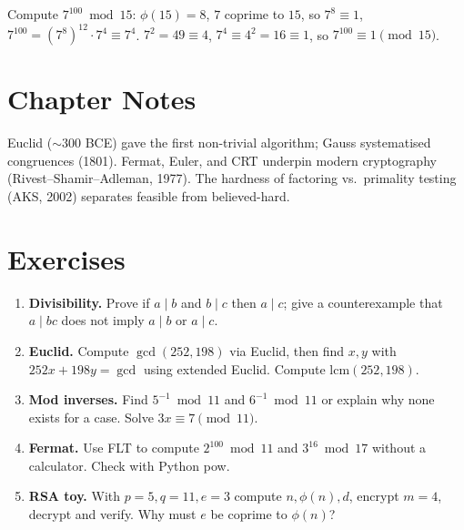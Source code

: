 Compute $7^{100}\bmod15$: $\phi(15)=8$, $7$ coprime to $15$, so $7^8\equiv1$, $7^{100}=(7^8)^{12}\cdot7^4\equiv7^4$. $7^2=49\equiv4$, $7^4\equiv4^2=16\equiv1$, so $7^{100}\equiv1\pmod{15}$.

\section{Chapter Notes}
Euclid ($\sim300$ BCE) gave the first non-trivial algorithm; Gauss systematised congruences (1801). Fermat, Euler, and CRT underpin modern cryptography (Rivest--Shamir--Adleman, 1977). The hardness of factoring vs.\ primality testing (AKS, 2002) separates feasible from believed-hard.

\section{Exercises}
\label{sec:ch08-exercises}
\begin{enumerate}[label=E8.\arabic*, leftmargin=*, itemsep=0.6em]
\item \textbf{Divisibility.} Prove if $a\mid b$ and $b\mid c$ then $a\mid c$; give a counterexample that $a\mid bc$ does not imply $a\mid b$ or $a\mid c$.
\item \textbf{Euclid.} Compute $\gcd(252,198)$ via Euclid, then find $x,y$ with $252x+198y=\gcd$ using extended Euclid. Compute $\mathrm{lcm}(252,198)$.
\item \textbf{Mod inverses.} Find $5^{-1}\bmod11$ and $6^{-1}\bmod11$ or explain why none exists for a case. Solve $3x\equiv7\pmod{11}$.
\item \textbf{Fermat.} Use FLT to compute $2^{100}\bmod11$ and $3^{16}\bmod17$ without a calculator. Check with Python pow.
\item \textbf{RSA toy.} With $p=5,q=11,e=3$ compute $n,\phi(n),d$, encrypt $m=4$, decrypt and verify. Why must $e$ be coprime to $\phi(n)$?
\end{enumerate}
